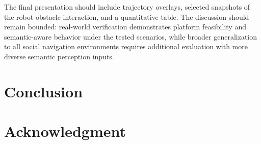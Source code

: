 \documentclass[journal]{IEEEtranTIE}
\begin{document}
    The final presentation should include trajectory overlays, selected
    snapshots of the robot-obstacle interaction, and a quantitative table. The
    discussion should remain bounded: real-world verification demonstrates
    platform feasibility and semantic-aware behavior under the tested scenarios,
    while broader generalization to all social navigation environments requires
    additional evaluation with more diverse semantic perception inputs.


    \section{Conclusion}
    \label{sec:Conclusion}


    \section*{Acknowledgment}

    
    
\end{document}

